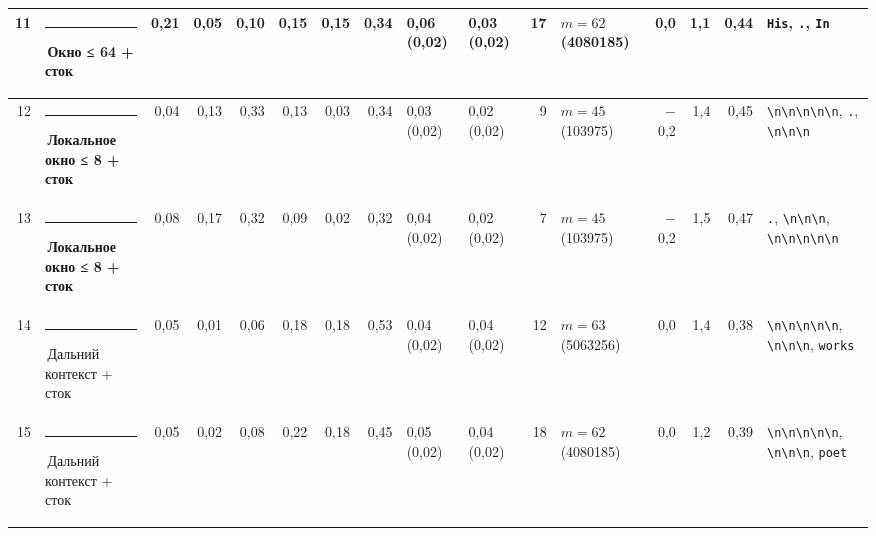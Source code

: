 \documentclass[10pt]{article}
\begin{document}
\begin{minipage}{\linewidth}
\begin{center}
{\begin{tabular}{|r|l|r|r|r|r|r|r|l|l|r|l|r|r|r|l|}
11 & \textcolor[HTML]{EDA100}{\rule{0.62em}{0.62em}}\,\textbf{Окно ≤ 64 + сток} & 0,21 & 0,05 & 0,10 & 0,15 & 0,15 & 0,34 & 0,06 (0,02) & 0,03 (0,02) & 17 & $m{=}62$ (4080185) & 0,0 & 1,1 & 0,44 & \texttt{\textvisiblespace{}His}, \texttt{\textvisiblespace{}.}, \texttt{\textvisiblespace{}In} \\ \hline
12 & \textcolor[HTML]{1BAF7A}{\rule{0.62em}{0.62em}}\,\textbf{Локальное окно ≤ 8 + сток} & 0,04 & 0,13 & 0,33 & 0,13 & 0,03 & 0,34 & 0,03 (0,02) & 0,02 (0,02) & 9 & $m{=}45$ (103975) & $-$0,2 & 1,4 & 0,45 & \texttt{\textvisiblespace{}\textbackslash{}n\textbackslash{}n\textbackslash{}n\textbackslash{}n\textbackslash{}n}, \texttt{\textvisiblespace{}.}, \texttt{\textvisiblespace{}\textbackslash{}n\textbackslash{}n\textbackslash{}n} \\ \hline
13 & \textcolor[HTML]{1BAF7A}{\rule{0.62em}{0.62em}}\,\textbf{Локальное окно ≤ 8 + сток} & 0,08 & 0,17 & 0,32 & 0,09 & 0,02 & 0,32 & 0,04 (0,02) & 0,02 (0,02) & 7 & $m{=}45$ (103975) & $-$0,2 & 1,5 & 0,47 & \texttt{\textvisiblespace{}.}, \texttt{\textvisiblespace{}\textbackslash{}n\textbackslash{}n\textbackslash{}n}, \texttt{\textvisiblespace{}\textbackslash{}n\textbackslash{}n\textbackslash{}n\textbackslash{}n\textbackslash{}n} \\ \hline
14 & \textcolor[HTML]{C3C2B7}{\rule{0.62em}{0.62em}}\,Дальний контекст + сток & 0,05 & 0,01 & 0,06 & 0,18 & 0,18 & 0,53 & 0,04 (0,02) & 0,04 (0,02) & 12 & $m{=}63$ (5063256) & 0,0 & 1,4 & 0,38 & \texttt{\textvisiblespace{}\textbackslash{}n\textbackslash{}n\textbackslash{}n\textbackslash{}n\textbackslash{}n}, \texttt{\textvisiblespace{}\textbackslash{}n\textbackslash{}n\textbackslash{}n}, \texttt{\textvisiblespace{}works} \\ \hline
15 & \textcolor[HTML]{C3C2B7}{\rule{0.62em}{0.62em}}\,Дальний контекст + сток & 0,05 & 0,02 & 0,08 & 0,22 & 0,18 & 0,45 & 0,05 (0,02) & 0,04 (0,02) & 18 & $m{=}62$ (4080185) & 0,0 & 1,2 & 0,39 & \texttt{\textvisiblespace{}\textbackslash{}n\textbackslash{}n\textbackslash{}n\textbackslash{}n\textbackslash{}n}, \texttt{\textvisiblespace{}\textbackslash{}n\textbackslash{}n\textbackslash{}n}, \texttt{\textvisiblespace{}poet} \\ \hline
\hline\end{tabular}}\end{center}
\end{minipage}
\par\vspace{0.4em}
\end{document}
